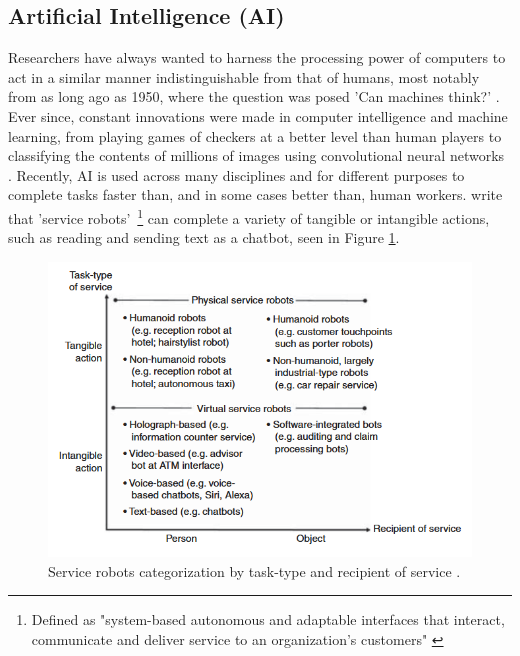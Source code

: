 \documentclass[12pt]{report}
\begin{document}
    \subsection{Artificial Intelligence (AI)}


    Researchers have always wanted to harness the processing power of computers to act in a similar manner 
    indistinguishable from that of humans, most notably from as long ago as 1950, where the question was posed 
    'Can machines think?' \autocite{turing_icomputing_1950}. Ever since, constant innovations were made in computer 
    intelligence and machine learning, from playing games of checkers at a better level than human players \autocite{samuel_studies_1959}
    to classifying the contents of millions of images using convolutional neural networks \autocite{krizhevsky_imagenet_2012}.
    Recently, AI is used across many disciplines and for different purposes to complete tasks faster than, and in some cases better than,
    human workers. \textcite{wirtz_brave_2018} write that 'service robots'~\footnote{Defined as "system-based autonomous and adaptable interfaces that 
    interact, communicate and deliver service to an organization’s customers" \autocite[p.909]{wirtz_brave_2018}} can complete a variety of 
    tangible or intangible actions, such as reading and sending text as a chatbot, seen in Figure \ref{fig:serviceBots}.
    
    \begin{figure}[H]
        \centering
        \includegraphics[width=.8\linewidth]{serviceBots.png}
        \caption{Service robots categorization by task-type and recipient of service \autocite{wirtz_brave_2018}.}
        \label{fig:serviceBots}
    \end{figure}
\end{document}
